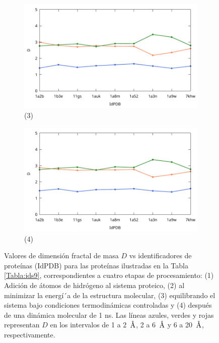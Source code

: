 \begin{figure}[H]
		\begin{subfigure}{0.49\textwidth}
			\centering
			\includegraphics[width=\linewidth,page=1]{graphs/PDBs/Dvsldx/DvsEq.pdf}
			\caption{(3)}
		\end{subfigure}
		\hfill
		\begin{subfigure}{0.49\textwidth}
			\centering
			\includegraphics[width=\linewidth,page=1]{graphs/PDBs/Dvsldx/DvsDm.pdf}
			\caption{(4)}
		\end{subfigure}
		
		\caption{Valores de dimensi\'{o}n fractal de masa $D$ vs identificadores de prote\'{i}nas (IdPDB) para las prote\'{i}nas ilustradas en la Tabla \ref{Tabla:ids9}, correspondientes a cuatro etapas de procesamiento: (1) Adici\'{o}n de \'{a}tomos de hidr\'{o}geno al sistema proteico, (2) al minimizar la energ\'{i´}a de la estructura molecular, (3) equilibrando el sistema bajo condiciones termodin\'{a}micas controladas y (4) despu\'{e}s de una din\'{a}mica molecular de 1 ns. Las l\'{i}neas azules, verdes y rojas representan $D$ en los intervalos de 1 a 2~$\textup{\r{A}}$, 2 a 6~$\textup{\r{A}}$ y 6 a 20~$\textup{\r{A}}$, respectivamente.}
		\label{fig:Df-general}
	\end{figure}
	
